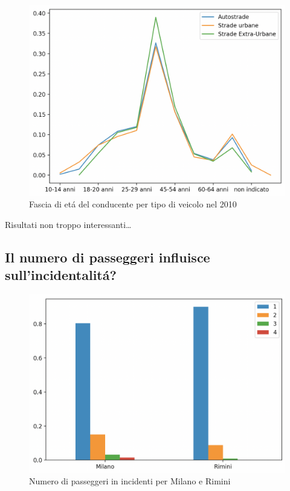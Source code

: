 \documentclass[a4paper]{report}
\begin{document}
\begin{figure}[!ht]
    \includegraphics[width=\linewidth]{../src/incidenti/incidenti_senza_coords/tipo_veicoli/differenza_eta.png}
    \caption{Fascia di et\'a del conducente per tipo di veicolo nel 2010}
    \label{fig:differenza_eta}
\end{figure}

Risultati non troppo interessanti\dots


\clearpage
\subsection{Il numero di passeggeri influisce sull'incidentalit\'a?}

\begin{figure}[!ht]
    \includegraphics[width=\linewidth]{../src/incidenti/incidenti_senza_coords/tipo_veicoli/passeggeri.png}
    \caption{Numero di passeggeri in incidenti per Milano e Rimini}
    \label{fig:passeggeri_milano_rimini}
\end{figure}
\end{document}
